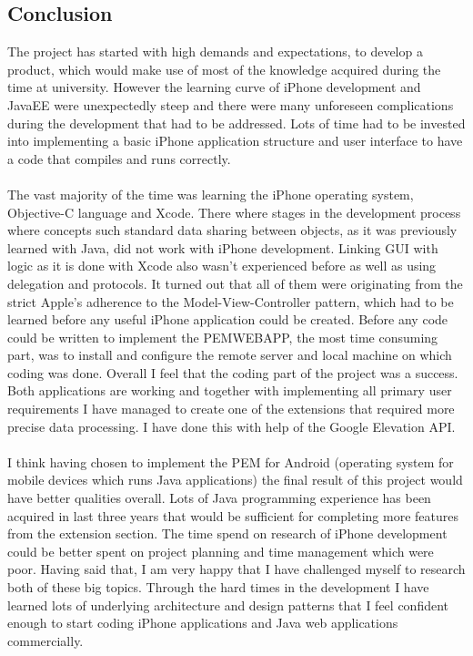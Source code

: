 \documentclass[12pt, a4paper]{report}   %
\begin{document}
\begin{enumerate}
\chapter{Conclusion}
The project has started with high demands and expectations, to develop a product, which would make use of most of the knowledge acquired during the time at university. However the learning curve of iPhone development and JavaEE were unexpectedly steep and there were many unforeseen complications during the development that had to be addressed. Lots of time had to be invested into implementing a basic iPhone application structure and user interface to have a code that compiles and runs correctly.\\ \\
The vast majority of the time was learning the iPhone operating system, Objective-C language and Xcode. There where stages in the development process where concepts such standard data sharing between objects, as it was previously learned with Java, did not work with iPhone development. Linking GUI with logic as it is done with Xcode also wasn’t experienced before as well as using delegation and protocols. It turned out that all of them were originating from the strict Apple’s adherence to the Model-View-Controller pattern, which had to be learned before any useful iPhone application could be created.
Before any code could be written to implement the PEMWEBAPP, the most time consuming part, was to install and configure the remote server and local machine on which coding was done.
Overall I feel that the coding part of the project was a success. Both applications are working and together with implementing all primary user requirements I have managed to create one of the extensions that required more precise data processing. I have done this with help of the Google Elevation API.\\ \\

I think having chosen to implement the PEM for Android (operating system for mobile devices which runs Java applications) the final result of this project would have better qualities overall. Lots of Java programming experience has been acquired in last three years that would be sufficient for completing more features from the extension section. The time spend on research of iPhone development could be better spent on project planning and time management which were poor.
Having said that, I am very happy that I have challenged myself to research both of these big topics. Through the hard times in the development I have learned lots of underlying architecture and design patterns that I feel confident enough to start coding iPhone applications and Java web applications commercially.


\end{enumerate}
\end{document}
